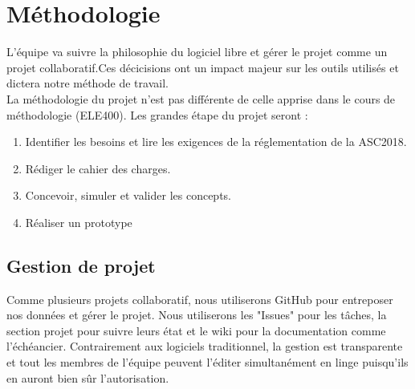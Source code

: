 \section{Méthodologie}
L'équipe va suivre la philosophie du logiciel libre et gérer le projet comme un projet collaboratif.Ces décicisions 
ont un impact majeur sur les outils utilisés et dictera notre méthode de travail. \\
La méthodologie du projet n'est pas différente de celle apprise dans le cours de méthodologie (ELE400). Les grandes étape du projet seront : 
\begin{enumerate}
	\item Identifier les besoins et lire les exigences de la réglementation de la ASC2018.
	\item Rédiger le cahier des charges.
	\item Concevoir, simuler et valider les concepts.
	\item Réaliser un prototype
\end{enumerate}

\subsection{Gestion de projet}
Comme plusieurs projets collaboratif, nous utiliserons GitHub pour entreposer nos données et gérer le projet. Nous utiliserons les "Issues" pour les tâches, la section projet pour suivre leurs état et le wiki pour la documentation comme l'échéancier. Contrairement aux logiciels traditionnel, la gestion est transparente et tout les membres de l'équipe peuvent l'éditer simultanément en linge puisqu'ils en auront bien sûr l'autorisation. 

